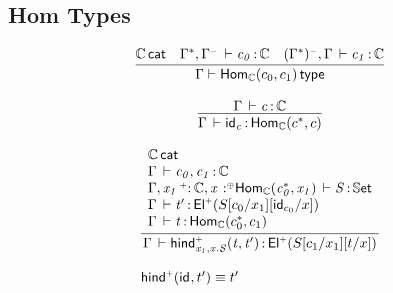 \documentclass[11pt]{article}
\theoremstyle{plain}
\begin{document}

\subsection{Hom Types}

\[
\begin{array}{c}
\infer{\wftp{\Gamma}{\Hom{\C}{c_0}{c_1}}}
      {\wfdtp{\C} &
        \oftp{\Gamma^*,\Gamma^\con}{c_0}{\C} & 
        \oftp{(\Gamma^*)^\con,\Gamma}{c_1}{\C} 
      }
\\ \\
\infer{\oftp{\Gamma}{\idm{c}}{\Hom{\C}{c^*}{c}}}
      {\oftp{\Gamma}{c}{\C}
      }
\end{array}
\]


\[
\begin{array}{l}
\infer{\oftp{\Gamma}{\morindco{x_1,x.S}{t}{t'}}{\Elp{\subst{\subst{S}{c_1}{x_1}}{t}{x}}}}
      { \begin{array}{l}
          \wfdtp{\C} \\
          \oftp{\Gamma}{c_0,c_1}{\C} \\
          \ofdtp{\Gamma,\vtptm{x_1}{\co}{\C},\tptmv{x}{\coc}{\Hom{\C}{c_0^*}{x_1}}}{S}{\types} \\
          \oftp{\Gamma}{t'}{\Elp{\subst{\subst{S}{c_0}{x_1}}{\idm{c_0}}{x}}} \\
          \oftp{\Gamma}{t}{\Hom{\C}{c_0^*}{c_1}} \\
        \end{array}
      }
\\ \\
\morindco{}{\idm{}}{t'} \deq t'
\end{array}
\]
\end{document}
